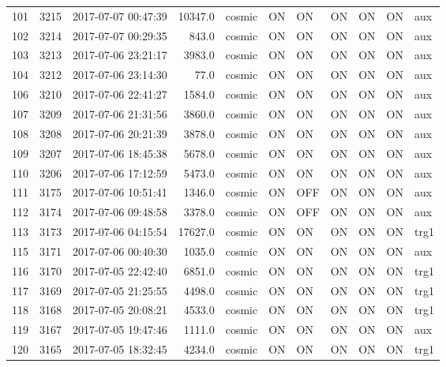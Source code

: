 \begin{longtable}{lrlrlllllll}
101 &  3215 &  2017-07-07 00:47:39 &   10347.0 &   cosmic &  ON &   ON &   ON &  ON &   ON &       aux\\
102 &  3214 &  2017-07-07 00:29:35 &     843.0 &   cosmic &  ON &   ON &   ON &  ON &   ON &       aux\\
103 &  3213 &  2017-07-06 23:21:17 &    3983.0 &   cosmic &  ON &   ON &   ON &  ON &   ON &       aux\\
104 &  3212 &  2017-07-06 23:14:30 &      77.0 &   cosmic &  ON &   ON &   ON &  ON &   ON &       aux\\
106 &  3210 &  2017-07-06 22:41:27 &    1584.0 &   cosmic &  ON &   ON &   ON &  ON &   ON &       aux\\
107 &  3209 &  2017-07-06 21:31:56 &    3860.0 &   cosmic &  ON &   ON &   ON &  ON &   ON &       aux\\
108 &  3208 &  2017-07-06 20:21:39 &    3878.0 &   cosmic &  ON &   ON &   ON &  ON &   ON &       aux\\
109 &  3207 &  2017-07-06 18:45:38 &    5678.0 &   cosmic &  ON &   ON &   ON &  ON &   ON &       aux\\
110 &  3206 &  2017-07-06 17:12:59 &    5473.0 &   cosmic &  ON &   ON &   ON &  ON &   ON &       aux\\
111 &  3175 &  2017-07-06 10:51:41 &    1346.0 &   cosmic &  ON &  OFF &   ON &  ON &   ON &       aux\\
112 &  3174 &  2017-07-06 09:48:58 &    3378.0 &   cosmic &  ON &  OFF &   ON &  ON &   ON &       aux\\
113 &  3173 &  2017-07-06 04:15:54 &   17627.0 &   cosmic &  ON &   ON &   ON &  ON &   ON &      trg1\\
115 &  3171 &  2017-07-06 00:40:30 &    1035.0 &   cosmic &  ON &   ON &   ON &  ON &   ON &       aux\\
116 &  3170 &  2017-07-05 22:42:40 &    6851.0 &   cosmic &  ON &   ON &   ON &  ON &   ON &      trg1\\
117 &  3169 &  2017-07-05 21:25:55 &    4498.0 &   cosmic &  ON &   ON &   ON &  ON &   ON &      trg1\\
118 &  3168 &  2017-07-05 20:08:21 &    4533.0 &   cosmic &  ON &   ON &   ON &  ON &   ON &      trg1\\
119 &  3167 &  2017-07-05 19:47:46 &    1111.0 &   cosmic &  ON &   ON &   ON &  ON &   ON &       aux\\
120 &  3165 &  2017-07-05 18:32:45 &    4234.0 &   cosmic &  ON &   ON &   ON &  ON &   ON &      trg1\\

\end{longtable}
